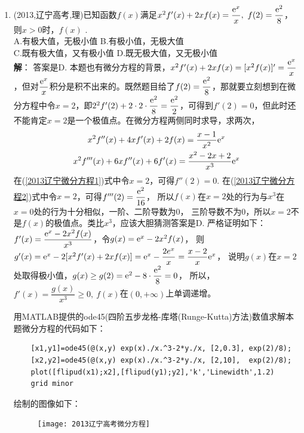 \begin{enumerate}[label={\textbf{\arabic*.}},leftmargin=
    \inteval{\myenumleftmargin}pt]
\item (2013,辽宁高考,理)已知函数$ f(x) $满足$ x^2f'(x)+2xf(x)=\dfrac{\e^x}{x},\ f(2)=\dfrac{\e^2}{8} $，则$ x>0 $时，$ f(x) $ \underline{\hspace{2cm}}. \\
A.有极大值，无极小值 \hspace{2cm}     B.有极小值，无极大值\\
C.既有极大值，又有极小值\hspace{1.4cm}  D.既无极大值，又无极小值 \\
\ifteach  \textbf{解}：
答案是D. 本题也有微分方程的背景，$ x^2f'(x)+2xf(x)=[x^2f(x)]'=\dfrac{\mathrm{e}^x}{x} $，但对$ \dfrac{\mathrm{e}^x}{x} $积分是积不出来的。既然题目给了$ f(2)=\dfrac{\mathrm{e}^2}{8} $，那就要立刻想到在微分方程中令$ x=2 $，即$ 2^2f'(2)+2\cdot 2\cdot \dfrac{\mathrm{e}^2}{8}=\dfrac{\mathrm{e}^2}{2} $，可得到$ f'(2)=0 $，但此时还不能肯定$ x=2 $是一个极值点。在微分方程两侧同时求导，求两次，
\begin{gather}
    x^2f''(x)+4xf'(x)+2f(x)=\dfrac{x-1}{x^2}\mathrm{e}^x \label{2013辽宁微分方程1} \\
    x^2f'''(x)+6xf''(x)+6f'(x)=\dfrac{x^2-2x+2}{x^3}\mathrm{e}^x  \label{2013辽宁微分方程2}
\end{gather}
在(\ref{2013辽宁微分方程1})式中令$ x=2 $，可得$ f''(2)=0 $. 
在(\ref{2013辽宁微分方程2})式中令$ x=2 $，可得$ f'''(2)=\dfrac{\mathrm{e}^2}{16} $，
所以$ f(x) $在$ x=2 $处的行为与$ x^3 $在$ x=0 $处的行为十分相似，一阶、二阶导数为0，
三阶导数不为0，所以$ x=2 $不是$ f(x) $的极值点。类比$ x^3 $，应该大胆猜测答案是D.
严格证明如下：$ f'(x)=\dfrac{\mathrm{e}^x-2x^2f(x)}{x^3} $，令$ g(x)=\mathrm{e}^x-2x^2f(x) $，
则$ g'(x)=\mathrm{e}^x-2[x^2f'(x)+2xf(x)]=\mathrm{e}^x-\dfrac{2e^x}{x}=\dfrac{x-2}{x}\mathrm{e}^x $，
说明$ g(x) $在$ x=2 $处取得极小值，$ g(x)\geq g(2)=\mathrm{e}^2-8\cdot \dfrac{\mathrm{e}^2}{8}=0 $，
所以，$ f'(x)=\dfrac{g(x)}{x^3}\geq 0,\ f(x) $在$ (0,+\infty) $上单调递增。

用MATLAB提供的ode45(四阶五步龙格-库塔(Runge-Kutta)方法)数值求解本题微分方程的代码如下：
\begin{lstlisting}
    [x1,y1]=ode45(@(x,y) exp(x)./x.^3-2*y./x, [2,0.3], exp(2)/8);
    [x2,y2]=ode45(@(x,y) exp(x)./x.^3-2*y./x, [2,10],  exp(2)/8);
    plot([flipud(x1);x2],[flipud(y1);y2],'k','Linewidth',1.2)
    grid minor
\end{lstlisting} 
绘制的图像如下：
\begin{figure}[!htbp]
    \centering
    \texttt{[image: 2013辽宁高考微分方程]}
\end{figure}
\fi


\end{enumerate}
